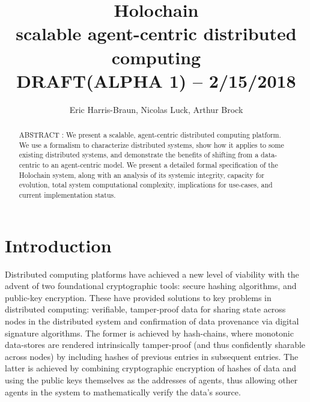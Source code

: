 \documentclass[twocolumn,showpacs,%
  nofootinbib,aps,superscriptaddress,%
  eqsecnum,prd,notitlepage,showkeys,10pt]{revtex4-1}
\begin{document}
\newcommand\todo[1]{\textcolor{red}{#1}}
\newcommand\term[1]{\textbf{\textit{#1}}}
\newcommand{\sbtc}{$\Omega_{\text{bitcoin}}$}
\newcommand{\sgit}{$\Omega_{\text{git}}$}
\newcommand{\shc}{$\Omega_{\text{hc}}$}
\newcommand{\hcdna}{$\text{DNA}$}
\newcommand{\hcid}{\iota}
\newcommand{\dhtget}{\texttt{get}}
\newcommand{\dhtput}{\texttt{put}}
\newcommand{\dhtstate}{\Delta}
\newcommand{\dhtfns}{F_\mathrm{DHT}}
\newcommand{\sysfns}{F_\mathrm{sys}}
\newcommand{\appfns}{F_\mathrm{app}}
\newcommand{\hcdht}{DHT_\text{hc}}
\newcommand{\chain}{\mathcal{X}}
\newcommand{\eqbang}{\stackrel{!}{=}}

\title{Holochain \\
\small scalable agent-centric distributed computing\\DRAFT(ALPHA 1) -- 2/15/2018}

\author{Eric Harris-Braun, Nicolas Luck, Arthur Brock}


\begin{abstract}
ABSTRACT : We present a scalable, agent-centric distributed computing platform.  We use a  formalism to characterize distributed systems, show how it applies to some existing distributed systems, and demonstrate the benefits of shifting from a data-centric to an agent-centric model. We present a detailed formal specification of the Holochain system, along with an analysis of its systemic integrity, capacity for evolution, total system computational complexity, implications for use-cases, and current implementation status.

\end{abstract}

\maketitle

\section{Introduction}
\label{sec:intro}

Distributed computing platforms have achieved a new level of viability with the advent of two foundational cryptographic tools: secure hashing algorithms, and public-key encryption.  These have provided solutions to key problems in distributed computing: verifiable, tamper-proof data for sharing state across nodes in the distributed system and confirmation of data provenance via digital signature algorithms.  The former is achieved by hash-chains, where monotonic data-stores are rendered intrinsically tamper-proof (and thus confidently sharable across nodes) by including hashes of previous entries in subsequent entries.  The latter is achieved by combining cryptographic encryption of hashes of data and using the public keys themselves as the addresses of agents, thus allowing other agents in the system to mathematically verify the data's source.
\end{document}
